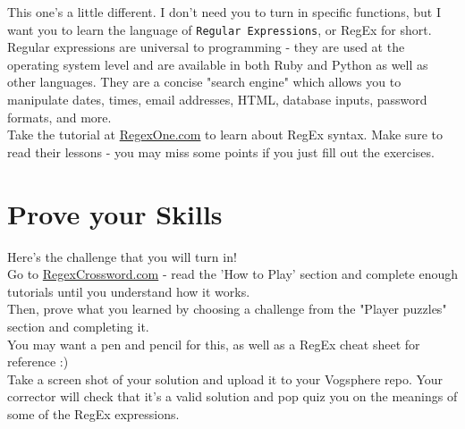 \documentclass{42-en}
\begin{document}
This one's a little different. I don't need you to turn in specific functions, but I want you to learn the language of \texttt{Regular Expressions}, or RegEx for short.\\

Regular expressions are universal to programming - they are used at the operating system level and are available in both Ruby and Python as well as other languages. They are a concise "search engine" which allows you to manipulate dates, times, email addresses, HTML, database inputs, password formats, and more.\\

Take the tutorial at \href{https://regexone.com/}{RegexOne.com} to learn about RegEx syntax. Make sure to read their lessons - you may miss some points if you just fill out the exercises.\\



\chapter{Prove your Skills}

Here's the challenge that you will turn in!\\

Go to \href{https://regexcrossword.com}{RegexCrossword.com} - read the 'How to Play' section and complete enough tutorials until you understand how it works.\\

Then, prove what you learned by choosing a challenge from the "Player puzzles" section and completing it.\\

You may want a pen and pencil for this, as well as a RegEx cheat sheet for reference :)\\

Take a screen shot of your solution and upload it to your Vogsphere repo. Your corrector will check that it's a valid solution and pop quiz you on the meanings of some of the RegEx expressions.\\
\end{document}
